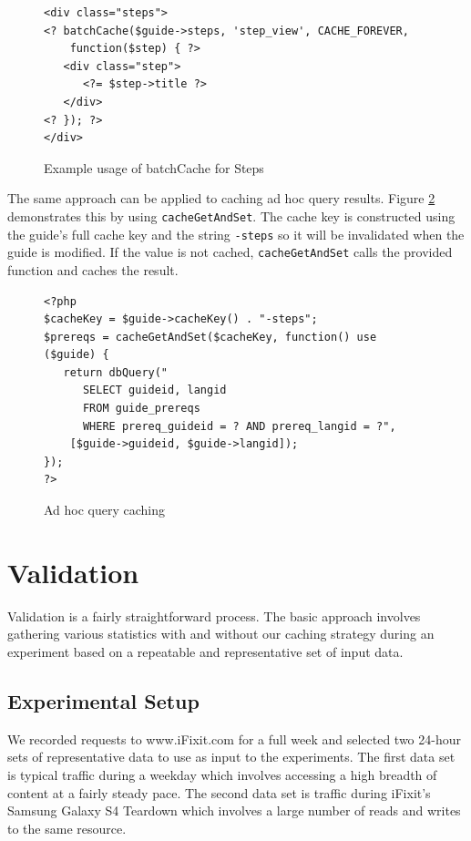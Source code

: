 \documentclass[12pt]{ucthesis}
\begin{document}
\begin{figure}[h]
\begin{ssp}
\begin{verbatim}
<div class="steps">
<? batchCache($guide->steps, 'step_view', CACHE_FOREVER,
    function($step) { ?>
   <div class="step">
      <?= $step->title ?>
   </div>
<? }); ?>
</div>
\end{verbatim}
\end{ssp}
\caption{Example usage of batchCache for Steps}
\label{fig:batchCacheStep}
\end{figure}

The same approach can be applied to caching ad hoc query results.
Figure \ref{fig:adHocQueryCaching} demonstrates this by using {\tt cacheGetAndSet}.
The cache key is constructed using the guide's full cache key and the string {\tt -steps} so it will be invalidated when the guide is modified.
If the value is not cached, {\tt cacheGetAndSet} calls the provided function and caches the result.

\begin{figure}[h]
\begin{ssp}
\begin{verbatim}
<?php
$cacheKey = $guide->cacheKey() . "-steps";
$prereqs = cacheGetAndSet($cacheKey, function() use ($guide) {
   return dbQuery("
      SELECT guideid, langid
      FROM guide_prereqs
      WHERE prereq_guideid = ? AND prereq_langid = ?",
    [$guide->guideid, $guide->langid]);
});
?>
\end{verbatim}
\end{ssp}
\caption{Ad hoc query caching}
\label{fig:adHocQueryCaching}
\end{figure}


\chapter{Validation} \label{validation}
Validation is a fairly straightforward process.
The basic approach involves gathering various statistics with and without our caching strategy during an experiment based on a repeatable and representative set of input data.

\section{Experimental Setup}
We recorded requests to \textsf{www.iFixit.com} for a full week and selected two 24-hour sets of representative data to use as input to the experiments.
The first data set is typical traffic during a weekday which involves accessing a high breadth of content at a fairly steady pace.
The second data set is traffic during \textsf{iFixit}'s Samsung Galaxy S4 Teardown\cite{ifixitGalaxyS4Teardown} which involves a large number of reads and writes to the same resource.
\end{document}
